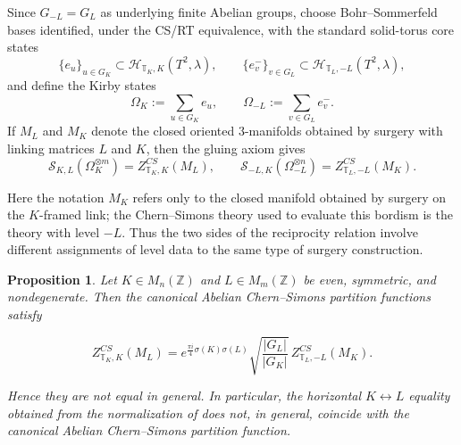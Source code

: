 \documentclass[12pt]{amsart}
\numberwithin{equation}{section}
\newtheorem{prop}[theorem]{Proposition}
\theoremstyle{definition}
\begin{document}
Since $G_{-L}=G_L$ as underlying finite Abelian groups, choose Bohr--Sommerfeld bases identified, under the CS/RT equivalence, with the standard solid-torus core states
$$
\{e_u\}_{u\in G_K}
\subset
\mathcal H_{\mathbb T_K,K}(T^2,\lambda),
\qquad
\{e_v^{-}\}_{v\in G_L}
\subset
\mathcal H_{\mathbb T_L,-L}(T^2,\lambda),
$$
and define the Kirby states
$$
\Omega_K
:=
\sum_{u\in G_K}e_u,
\qquad
\Omega_{-L}
:=
\sum_{v\in G_L}e_v^{-}.
$$
If $M_L$ and $M_K$ denote the closed oriented $3$-manifolds
obtained by surgery with linking matrices $L$ and $K$, then the
gluing axiom gives
$$
\mathcal S_{K,L}(\Omega_K^{\otimes m})
=
Z^{CS}_{\mathbb T_K,K}(M_L), \qquad
\mathcal S_{-L,K}(\Omega_{-L}^{\otimes n})
=
Z^{CS}_{\mathbb T_L,-L}(M_K).
$$

Here the notation $M_K$ refers only to the closed manifold obtained by surgery on the $K$-framed link; the Chern--Simons theory used to evaluate this bordism is the theory with level $-L$. Thus the two sides of the reciprocity relation involve different assignments of level data to the same type of surgery construction.

\begin{prop}
\label{prop:no-intrinsic-horizontal-reciprocity}
Let $K\in M_n(\mathbb Z)$ and $L\in M_m(\mathbb Z)$ be even, symmetric, and nondegenerate. Then the canonical Abelian Chern--Simons partition functions satisfy

\begin{equation}
Z^{CS}_{\mathbb T_K,K}(M_L)
=
e^{\frac{\pi i}{4}\sigma(K)\sigma(L)}
\sqrt{\frac{|G_L|}{|G_K|}}\,
Z^{CS}_{\mathbb T_L,-L}(M_K).
\end{equation}

Hence they are not equal in general. In particular, the horizontal $K\leftrightarrow L$ equality obtained from the normalization of \cite{Kim2024,Tagaris2025} does not, in general, coincide with the canonical Abelian Chern--Simons partition function.
\end{prop}
\end{document}
